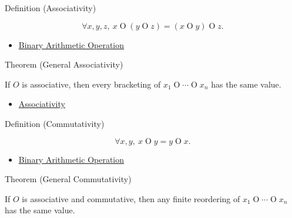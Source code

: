 \begin{definitionbox}{Definition (Associativity)}
\begin{definition}[Associativity]
\label{def:associativity}
\[
\forall x,y,z,\ x\mathbin{O}(y\mathbin{O}z)=(x\mathbin{O}y)\mathbin{O}z.
\]
\end{definition}
\end{definitionbox}

\begin{dependencies}
\begin{itemize}
  \item \hyperref[def:binary-arithmetic-operation]{Binary Arithmetic Operation}
\end{itemize}
\end{dependencies}

\begin{theorembox}{Theorem (General Associativity)}
\begin{theorem}
\label{thm:general-associativity}
If $O$ is associative, then every bracketing of
$x_1\mathbin{O}\cdots\mathbin{O}x_n$ has the same value.
\end{theorem}
\end{theorembox}

\begin{dependencies}
\begin{itemize}
  \item \hyperref[def:associativity]{Associativity}
\end{itemize}
\end{dependencies}

\begin{definitionbox}{Definition (Commutativity)}
\begin{definition}[Commutativity]
\label{def:commutativity}
\[
\forall x,y,\ x\mathbin{O}y=y\mathbin{O}x.
\]
\end{definition}
\end{definitionbox}

\begin{dependencies}
\begin{itemize}
  \item \hyperref[def:binary-arithmetic-operation]{Binary Arithmetic Operation}
\end{itemize}
\end{dependencies}

\begin{theorembox}{Theorem (General Commutativity)}
\begin{theorem}
\label{thm:general-commutativity}
If $O$ is associative and commutative, then any finite reordering of
$x_1\mathbin{O}\cdots\mathbin{O}x_n$ has the same value.
\end{theorem}
\end{theorembox}

